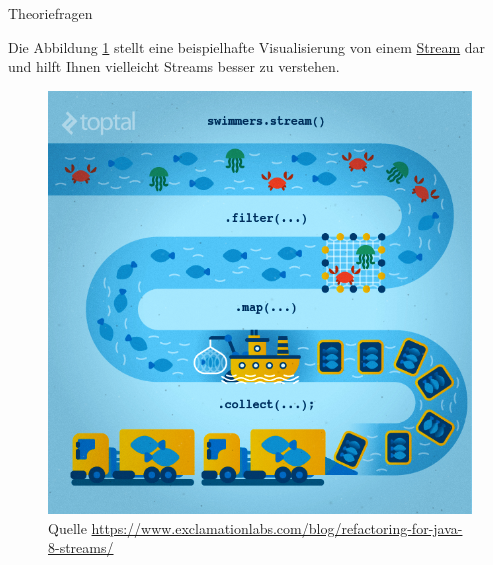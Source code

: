 \documentclass{../tuda-exercise}
\begin{document}
\begin{task}[credit = \stars{0}{3}]{Theoriefragen}
\begin{solution}
      \begin{note}[title=Information:]
        Die Abbildung \ref{fig:V1_Information} stellt eine beispielhafte Visualisierung von einem
        \href{https://docs.oracle.com/en/java/javase/11/docs/api/java.base/java/util/stream/Stream.html}{Stream} dar
        und hilft Ihnen vielleicht Streams besser zu verstehen.

        \begin{figure}[H]
          \centering
          \includegraphics[width=.45\linewidth]{graphics/stream_visual.png}
          \caption{Quelle \url{https://www.exclamationlabs.com/blog/refactoring-for-java-8-streams/}}
          \label{fig:V1_Information}
        \end{figure}
      \end{note}
    \end{solution}
  \end{task}

  \clearpage
\end{document}
